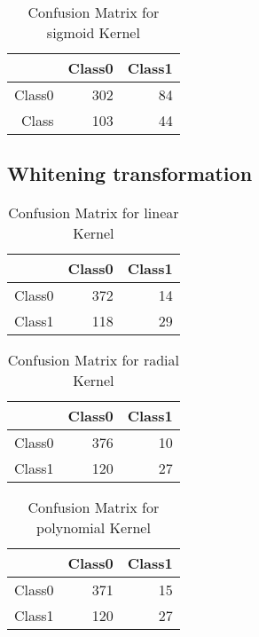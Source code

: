 \begin{table}[H]
\centering
\begin{tabular}{rrr}
  \hline
 & Class0 & Class1 \\ 
  \hline
Class0 & 302 &  84 \\ 
  Class & 103 &  44 \\ 
   \hline
\end{tabular}
\caption{Confusion Matrix for sigmoid Kernel} 
\end{table}

\subsection{Whitening transformation}



\begin{table}[H]
\centering
\begin{tabular}{rrr}
  \hline
 & Class0 & Class1 \\ 
  \hline
Class0 & 372 &  14 \\ 
  Class1 & 118 &  29 \\ 
   \hline
\end{tabular}
\caption{Confusion Matrix for linear Kernel} 
\end{table}

\begin{table}[H]
\centering
\begin{tabular}{rrr}
  \hline
 & Class0 & Class1 \\ 
  \hline
Class0 & 376 &  10 \\ 
  Class1 & 120 &  27 \\ 
   \hline
\end{tabular}
\caption{Confusion Matrix for radial Kernel} 
\end{table}

\begin{table}[H]
\centering
\begin{tabular}{rrr}
  \hline
 & Class0 & Class1 \\ 
  \hline
Class0 & 371 &  15 \\ 
  Class1 & 120 &  27 \\ 
   \hline
\end{tabular}
\caption{Confusion Matrix for polynomial Kernel} 
\end{table}

